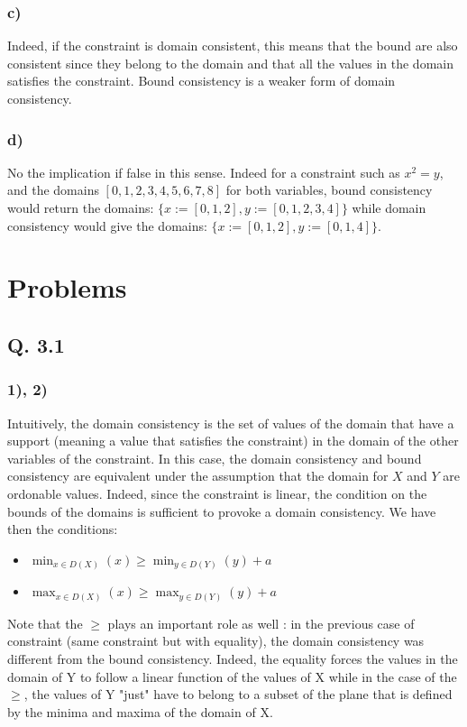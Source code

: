 \documentclass[a4paper ,12pt,french]{article}
\begin{document}
\subsubsection{c)}
Indeed, if the constraint is domain consistent, this means that the bound are also consistent since they belong to the domain and that all the values in the domain satisfies the constraint. Bound consistency is a weaker form of domain consistency. 

\subsubsection{d)}
No the implication if false in this sense. Indeed for a constraint such as $x^2 = y$, and the domains $[0, 1, 2, 3, 4, 5, 6, 7, 8]$ for both variables, bound consistency would return the domains: $\{x := [0, 1, 2], y := [0, 1, 2, 3, 4] \}$ while domain consistency would give the domains: $\{x := [0, 1, 2], y := [0, 1, 4] \}$.
\section{Problems}
\subsection{Q. 3.1}
\subsubsection{1), 2)}
Intuitively, the domain consistency is the set of values of the domain that have a support (meaning a value that satisfies the constraint) in the domain of the other variables of the constraint. In this case, the domain consistency and bound consistency are equivalent under the assumption that the domain for $X$ and $Y$ are ordonable values. Indeed, since the constraint is linear, the condition on the bounds of the domains is sufficient to provoke a domain consistency. We have then the conditions: 
\begin{itemize}
\item $\min_{x\in D(X)}(x) \geq \min_{y\in D(Y)}(y) + a$
\item $\max_{x\in D(X)}(x) \geq \max_{y\in D(Y)}(y) + a$
\end{itemize}
Note that the $\geq$ plays an important role as well : in the previous case of constraint (same constraint but with equality), the domain consistency was different from the bound consistency. Indeed, the equality forces the values in the domain of Y to follow a linear function of the values of X while in the case of the $\geq$, the values of Y "just" have to belong to a subset of the plane that is defined by the minima and maxima of the domain of X.
\end{document}

